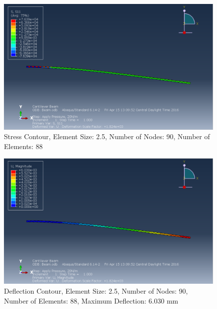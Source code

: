 \documentclass[a4paper]{article}
\begin{document}
\begin{figure}[ht]
\centering
\includegraphics[scale=.50]{3Nsize2_5Stress.PNG}
\caption{Stress Contour, Element Size: 2.5, Number of Nodes: 90, Number of Elements: 88}
\end{figure}
\begin{figure}[ht]
\centering
\includegraphics[scale=.50]{3Nsize2_5MDisplacement.PNG}
\caption{Deflection Contour, Element Size: 2.5, Number of Nodes: 90, Number of Elements: 88, Maximum Deflection: 6.030 mm}
\end{figure}
\end{document}
